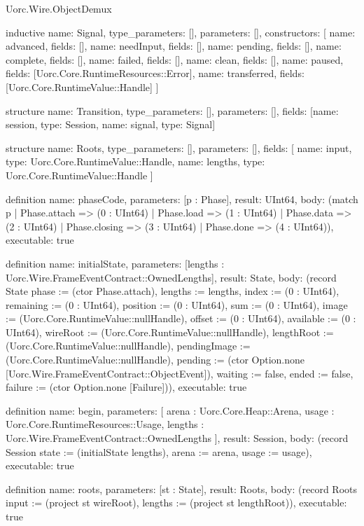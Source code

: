\begin{lexlean}{Uorc.Wire.ObjectDemux}
\begin{semanticmodule}
inductive{
  name: Signal,
  type_parameters: [],
  parameters: [],
  constructors: [
    {name: advanced, fields: []},
    {name: needInput, fields: []},
    {name: pending, fields: []},
    {name: complete, fields: []},
    {name: failed, fields: []},
    {name: clean, fields: []},
    {name: paused, fields: [Uorc.Core.RuntimeResources::Error]},
    {name: transferred, fields: [Uorc.Core.RuntimeValue::Handle]}
  ]
}

structure{
  name: Transition,
  type_parameters: [],
  parameters: [],
  fields: [{name: session, type: Session}, {name: signal, type: Signal}]
}

structure{
  name: Roots,
  type_parameters: [],
  parameters: [],
  fields: [
    {name: input, type: Uorc.Core.RuntimeValue::Handle},
    {name: lengths, type: Uorc.Core.RuntimeValue::Handle}
  ]
}

definition{
  name: phaseCode,
  parameters: [p : Phase],
  result: UInt64,
  body: (match p
    | Phase.attach => (0 : UInt64)
    | Phase.load => (1 : UInt64)
    | Phase.data => (2 : UInt64)
    | Phase.closing => (3 : UInt64)
    | Phase.done => (4 : UInt64)),
  executable: true
}

definition{
  name: initialState,
  parameters: [lengths : Uorc.Wire.FrameEventContract::OwnedLengths],
  result: State,
  body: (record State {phase := (ctor Phase.attach), lengths := lengths, index := (0 : UInt64), remaining := (0 : UInt64), position := (0 : UInt64), sum := (0 : UInt64), image := (Uorc.Core.RuntimeValue::nullHandle), offset := (0 : UInt64), available := (0 : UInt64), wireRoot := (Uorc.Core.RuntimeValue::nullHandle), lengthRoot := (Uorc.Core.RuntimeValue::nullHandle), pendingImage := (Uorc.Core.RuntimeValue::nullHandle), pending := (ctor Option.none [Uorc.Wire.FrameEventContract::ObjectEvent]), waiting := false, ended := false, failure := (ctor Option.none [Failure])}),
  executable: true
}

definition{
  name: begin,
  parameters: [
    arena : Uorc.Core.Heap::Arena,
    usage : Uorc.Core.RuntimeResources::Usage,
    lengths : Uorc.Wire.FrameEventContract::OwnedLengths
  ],
  result: Session,
  body: (record Session {state := (initialState lengths), arena := arena, usage := usage}),
  executable: true
}

definition{
  name: roots,
  parameters: [st : State],
  result: Roots,
  body: (record Roots {input := (project st wireRoot), lengths := (project st lengthRoot)}),
  executable: true
}


\end{semanticmodule}
\end{lexlean}
